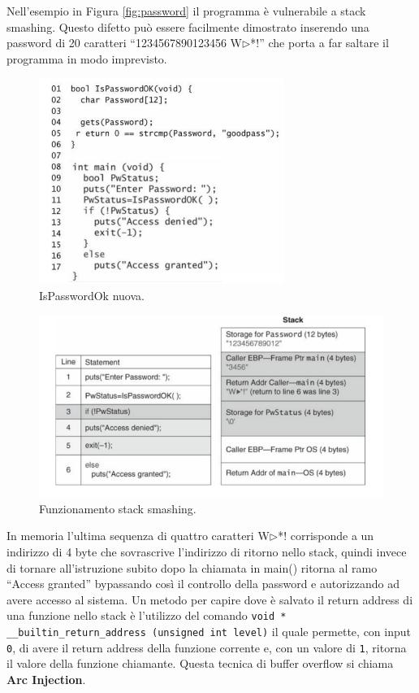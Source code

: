 Nell'esempio in Figura \ref{fig:password} il programma è vulnerabile a stack smashing.
Questo difetto può essere facilmente dimostrato inserendo una password di 20 caratteri
“1234567890123456 W$\triangleright$*!” che porta a far saltare il programma in modo
imprevisto.

\begin{figure}[H]
    \centering
    \includegraphics[width=8cm, keepaspectratio]{capitoli/secure_coding/img/cap_2/pass_ok_new.png}
    \caption{IsPasswordOk nuova.}\label{fig:pass_ok_new}
\end{figure}

\begin{figure}[H]
    \centering
    \includegraphics[width=13cm, keepaspectratio]{capitoli/secure_coding/img/cap_2/es_pass_ok_new.png}
    \caption{Funzionamento stack smashing.}\label{fig:es_pass_ok_new}
\end{figure}

In memoria l'ultima sequenza di quattro caratteri W$\triangleright$*! corrisponde a
un indirizzo di 4 byte che sovrascrive l'indirizzo di ritorno nello stack, quindi
invece di tornare all'istruzione subito dopo la chiamata in main() ritorna al ramo
“Access granted” bypassando così il controllo della password e autorizzando ad avere
accesso al sistema.
Un metodo per capire dove è salvato il return address di una funzione nello stack è
l'utilizzo del comando
\verb|void * __builtin_return_address (unsigned int level)| il quale permette, con
input \verb|0|, di avere il return address della funzione corrente e, con un valore di
\verb|1|, ritorna il valore della funzione chiamante. Questa tecnica di buffer overflow si
chiama \textbf{Arc Injection}.


